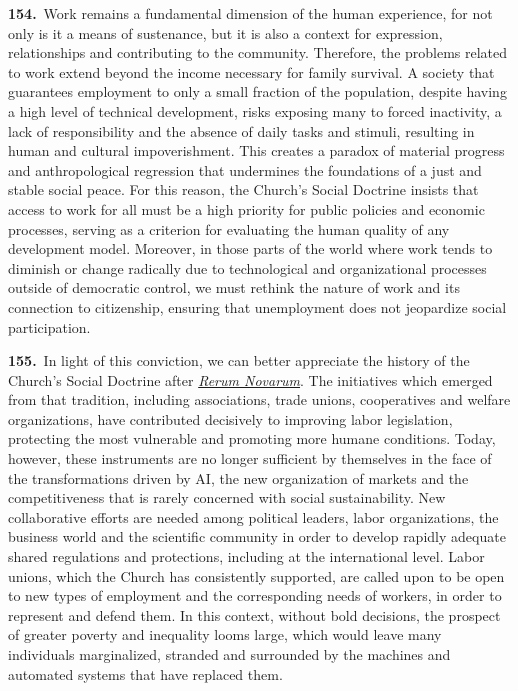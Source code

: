 \documentclass{article}
\begin{document}
\textbf{154.}\ Work remains a fundamental dimension of the human experience, for not only is it a means of sustenance, but it is also a context for expression, relationships and contributing to the community. Therefore, the problems related to work extend beyond the income necessary for family survival. A society that guarantees employment to only a small fraction of the population, despite having a high level of technical development, risks exposing many to forced inactivity, a lack of responsibility and the absence of daily tasks and stimuli, resulting in human and cultural impoverishment. This creates a paradox of material progress and anthropological regression that undermines the foundations of a just and stable social peace. For this reason, the Church's Social Doctrine insists that access to work for all must be a high priority for public policies and economic processes, serving as a criterion for evaluating the human quality of any development model.\cite{n155} Moreover, in those parts of the world where work tends to diminish or change radically due to technological and organizational processes outside of democratic control, we must rethink the nature of work and its connection to citizenship, ensuring that unemployment does not jeopardize social participation.

\textbf{155.}\ In light of this conviction, we can better appreciate the history of the Church's Social Doctrine after \href{https://www.vatican.va/content/leo-xiii/en/encyclicals/documents/hf_l-xiii_enc_15051891_rerum-novarum.html}{\emph{Rerum Novarum}}. The initiatives which emerged from that tradition, including associations, trade unions, cooperatives and welfare organizations, have contributed decisively to improving labor legislation, protecting the most vulnerable and promoting more humane conditions.\cite{n156} Today, however, these instruments are no longer sufficient by themselves in the face of the transformations driven by AI, the new organization of markets and the competitiveness that is rarely concerned with social sustainability. New collaborative efforts are needed among political leaders, labor organizations, the business world and the scientific community in order to develop rapidly adequate shared regulations and protections, including at the international level.\cite{n157} Labor unions, which the Church has consistently supported, are called upon to be open to new types of employment and the corresponding needs of workers, in order to represent and defend them. In this context, without bold decisions, the prospect of greater poverty and inequality looms large, which would leave many individuals marginalized, stranded and surrounded by the machines and automated systems that have replaced them.
\end{document}
